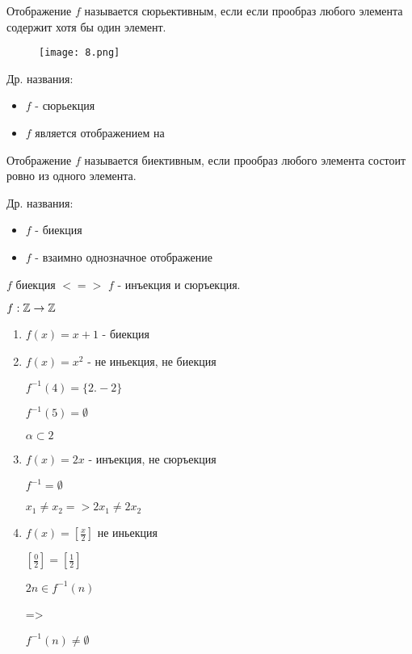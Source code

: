 \begin{definition}
    Отображение $f$ называется сюрьективным, если если прообраз любого элемента содержит хотя бы один элемент.

    \begin{figure}[H]
        \centering
        \texttt{[image: 8.png]}
        
        
        \label{fig:8}
    \end{figure}

    Др. названия:
    \begin{itemize}
        \item $f$ - сюрьекция
        \item $f$ является отображением на
    \end{itemize}
\end{definition}

\begin{definition}
    Отображение $f$ называется биективным, если прообраз любого элемента состоит ровно из одного элемента.
    
    Др. названия:
    \begin{itemize}
        \item $f$ - биекция
        \item $f$ - взаимно однозначное отображение
    \end{itemize}
\end{definition}

\begin{remark}
$f$ биекция $<=>$ $f$ - инъекция и сюръекция.
\end{remark}

\begin{eg}
    $f: \mathbb{Z} \rightarrow \mathbb{Z}$
\end{eg}

\begin{enumerate}
    \item $f(x) = x + 1$ - биекция
    \item { $f(x) = x^2$ - не иньекция, не биекция
    
    
    $f^{-1}(4) = \{2. -2\}$


    $f^{-1}(5) = \emptyset$


    $\alpha \subset 2$
    }
    \item {  $f(x) = 2x$ - инъекция, не сюръекция
    
    $f^{-1} = \emptyset$

    $x_1 \neq x_2 => 2x_1 \neq 2x_2$
    }

    \item { $f(x) = [\frac{x}{2}]$ не иньекция
    
    $[\frac{0}{2}] = [\frac{1}{2}]$

    $2n \in f^{-1}(n)$

    => 

    $f^{-1}(n) \neq \emptyset$
    }
\end{enumerate}


